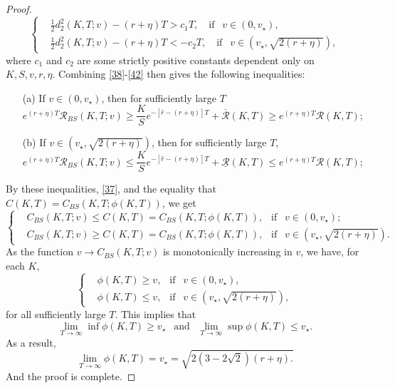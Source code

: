 \documentclass[a4 paper, 12pt]{report}
\theoremstyle{plain}
\begin{document}
\begin{proof}
\begin{equation}\label{42}
\left\{
\begin{split}
&\frac{1}{2}d_2^2(K,T;v) - (r+\eta)T>c_1T,~~~\mbox{  if  }~~ v\in (0,v_\star),\\
&\frac{1}{2}d_2^2(K,T;v) - (r+\eta)T<-c_2T,~~~\mbox{  if  }~~ v\in (v_\star,\sqrt{2(r+\eta)}),
\end{split}
\right.
\end{equation}
where $c_1$ and $c_2$ are some strictly positive constants dependent only on $K, S, v, r, \eta$. Combining \eqref{38}-\eqref{42} then gives the following inequalities:
\begin{enumerate}
\item[(a)] If $v\in(0,v_\star)$, then for sufficiently large $T$
$$
e^{(r+\eta)T}\mathcal{R}_{BS}(K,T;v)\geq\frac{K}{S}e^{-[\hat{r} - (r+\eta)]T}+\overline{\mathcal{R}}(K,T)\geq e^{(r+\eta)T}\mathcal{R}(K,T);
$$
\item[(b)] If $v\in (v_\star,\sqrt{2(r+\eta)})$, then for sufficiently large $T$,
$$
e^{(r+\eta)T}\mathcal{R}_{BS}(K,T;v)\leq\frac{K}{S}e^{-[\hat{r} - (r+\eta)]T}+\underline{\mathcal{R}}(K,T)\leq e^{(r+\eta)T}\mathcal{R}(K,T);
$$
\end{enumerate}
By these inequalities, \eqref{37}, and the equality that $C(K,T) = C_{BS}(K,T;\phi(K,T))$, we get
\begin{equation*}
\left\{
\begin{split}
&C_{BS}(K,T;v)\leq C(K,T) = C_{BS}(K,T;\phi(K,T)),~~\mbox{  if  }~~v\in (0,v_\star);\\
&C_{BS}(K,T;v)\geq C(K,T) = C_{BS}(K,T;\phi(K,T)),~~\mbox{  if  }~~v\in (v_\star,\sqrt{2(r+\eta)}).
\end{split}
\right.
\end{equation*}
As the function $v\rightarrow C_{BS}(K,T;v)$ is monotonically increasing in $v$, we have, for each $K$,
\begin{equation*}
\left\{
\begin{split}
&\phi(K,T)\geq v,~~\mbox{  if  }~~ v\in(0,v_\star),\\
&\phi(K,T)\leq v,~~\mbox{  if  }~~ v\in(v_\star,\sqrt{2(r+\eta)}),
\end{split}
\right.
\end{equation*}
for all sufficiently large $T$. This implies that
$$
\lim_{T\rightarrow\infty}\inf\phi(K,T)\geq v_\star~~\mbox{  and  }~~\lim_{T\rightarrow\infty}\sup\phi(K,T)\leq v_\star.
$$
As a result,
$$
\lim_{T\rightarrow \infty}\phi(K,T) = v_\star = \sqrt{2(3 - 2\sqrt{2})(r+\eta).}
$$
And the proof is complete.
\end{proof}
\end{document}
